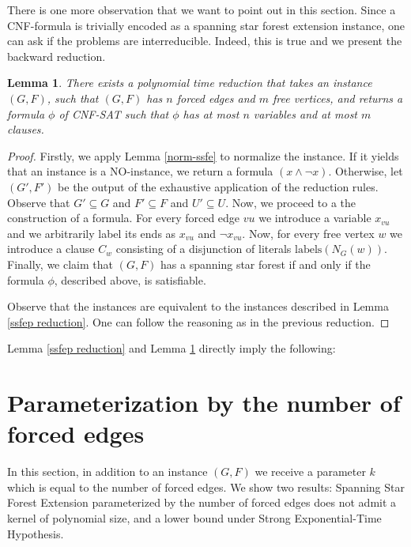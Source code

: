 \documentclass[en]{pracamgr}
\newtheorem{lemma}{Lemma}
\theoremstyle{definition}
\newcommand{\ssfep}{{\sc Spanning Star Forest Extension}}
\newcommand{\cnfsat}{{\sc CNF-SAT}}
\begin{document}
There is one more observation that we want to point out in this section. Since a CNF-formula is trivially encoded as a spanning star forest extension instance, one can ask if the problems are interreducible. Indeed, this is true and we present the backward reduction.

\begin{lemma}\label{cnfsat reduction}
	There exists a polynomial time reduction that takes an instance $(G,F)$, such that $(G,F)$ has $n$ forced edges and $m$ free vertices, and returns a formula $\phi$ of \cnfsat{} such that $\phi$ has at most $n$ variables and at most $m$ clauses.
\end{lemma}

\begin{proof}
	Firstly, we apply Lemma \ref{norm-ssfe} to normalize the instance. If it yields that an instance is a NO-instance, we return a formula $(x \land \neg x)$. Otherwise, let $(G',F')$ be the output of the exhaustive application of the reduction rules. Observe that $G' \subseteq G$ and $F' \subseteq F$ and $U' \subseteq U$. Now, we proceed to a the construction of a formula. For every forced edge $vu$ we introduce a variable $x_{vu}$ and we arbitrarily label its ends as $x_{vu}$ and $\neg x_{vu}$. Now, for every free vertex $w$ we introduce a clause $C_w$ consisting of a disjunction of literals $\textrm{labels}(N_G(w))$. Finally, we claim that $(G,F)$ has a spanning star forest if and only if the formula $\phi$, described above, is satisfiable.
	
	Observe that the instances are equivalent to the instances described in Lemma \ref{ssfep reduction}. One can follow the reasoning as in the previous reduction.
\end{proof}

Lemma \ref{ssfep reduction} and Lemma \ref{cnfsat reduction} directly imply the following:

\thmssfepnpc*

\section{Parameterization by the number of forced edges}

In this section, in addition to an instance $(G,F)$ we receive a parameter $k$ which is equal to the number of forced edges. We show two results: \ssfep{} parameterized by the number of forced edges does not admit a kernel of polynomial size, and a lower bound under Strong Exponential-Time Hypothesis.
\end{document}
